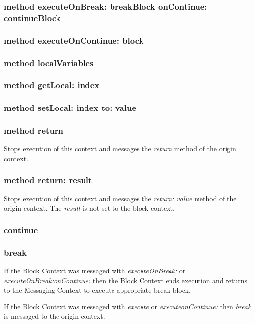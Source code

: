 \subsubsection{method executeOnBreak: breakBlock onContinue: continueBlock}

\subsubsection{method executeOnContinue: block}

\subsubsection{method localVariables}

\subsubsection{method getLocal: index}

\subsubsection{method setLocal: index to: value}

\subsubsection{method return}
Stops execution of this context and messages the \textit{return} method of the
origin context.

\subsubsection{method return: result}
Stops execution of this context and messages the \textit{return: value}
method of the origin context. The \textit{result} is not set to the
block context.

\subsubsection{continue}

\subsubsection{break}
If the Block Context was messaged with \textit{executeOnBreak:} or
\textit{executeOnBreak:onContinue:} then the Block Context ends execution
and returns to the Messaging Context to execute appropriate break block.

If the Block Context was messaged with \textit{execute} or
\textit{executeonContinue:} then \textit{break} is messaged to the origin
context.
